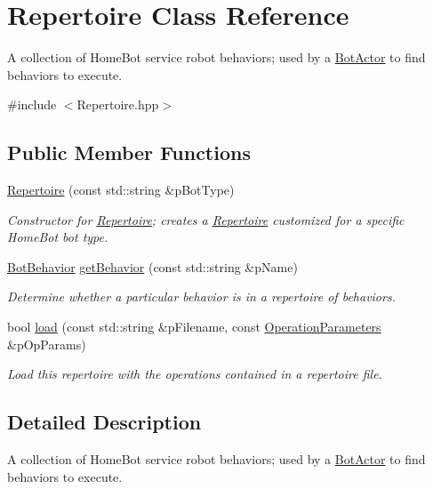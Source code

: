\hypertarget{classRepertoire}{\section{Repertoire Class Reference}
\label{classRepertoire}
}


A collection of Home\-Bot service robot behaviors; used by a \hyperlink{classBotActor}{Bot\-Actor} to find behaviors to execute.  




{\ttfamily \#include $<$Repertoire.\-hpp$>$}

\subsection*{Public Member Functions}
\begin{DoxyCompactItemize}
\item 
\hyperlink{classRepertoire_a9dd06d2b7804025aba51d5b371d32c28}{Repertoire} (const std\-::string \&p\-Bot\-Type)
\begin{DoxyCompactList}\small\item\em Constructor for \hyperlink{classRepertoire}{Repertoire}; creates a \hyperlink{classRepertoire}{Repertoire} customized for a specific Home\-Bot bot type. \end{DoxyCompactList}\item 
\hyperlink{classBotBehavior}{Bot\-Behavior} \hyperlink{classRepertoire_a758b2c4e9c9c3b3ca18affa27bd6c48e}{get\-Behavior} (const std\-::string \&p\-Name)
\begin{DoxyCompactList}\small\item\em Determine whether a particular behavior is in a repertoire of behaviors. \end{DoxyCompactList}\item 
bool \hyperlink{classRepertoire_ac0da6e67b445515bd8786a10d50c29ad}{load} (const std\-::string \&p\-Filename, const \hyperlink{classOperationParameters}{Operation\-Parameters} \&p\-Op\-Params)
\begin{DoxyCompactList}\small\item\em Load this repertoire with the operations contained in a repertoire file. \end{DoxyCompactList}\end{DoxyCompactItemize}


\subsection{Detailed Description}
A collection of Home\-Bot service robot behaviors; used by a \hyperlink{classBotActor}{Bot\-Actor} to find behaviors to execute. 

